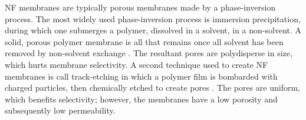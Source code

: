 \documentclass{article}
\begin{document}
 
  NF membranes are typically porous membranes made by a phase-inversion
  process.  The most widely used phase-inversion process is immersion
  precipitation, during which one submerges a polymer, dissolved in a solvent, in
  a non-solvent. A solid, porous polymer membrane is all that remains once all
  solvent has been removed by non-solvent exchange
  \cite{smolders_microstructures_1992}.  The resultant pores are polydisperse in
  size, which hurts membrane selectivity. A second technique used to create NF
  membranes is call track-etching in which a polymer film is bombarded with
  charged particles, then chemically etched to create pores
  \cite{apel_track_2001}. The pores are uniform, which benefits selectivity;
  however, the membranes have a low porosity and subsequently low permeability. 
 

\end{document}
